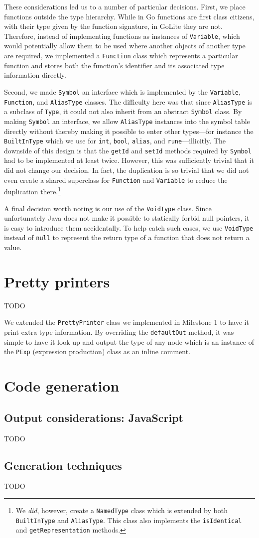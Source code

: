 \documentclass[oneside]{article}
\begin{document}
These considerations led us to a number of particular decisions. First, we place functions outside the type hierarchy. While in Go functions are first class citizens, with their type given by the function signature, in GoLite they are not. Therefore, instead of implementing functions as instances of \texttt{Variable}, which would potentially allow them to be used where another objects of another type are required, we implemented a \texttt{Function} class which represents a particular function and stores both the function's identifier and its associated type information directly.

Second, we made \texttt{Symbol} an interface which is implemented by the \texttt{Variable}, \texttt{Function}, and \texttt{AliasType} classes. The difficulty here was that since \texttt{AliasType} is a subclass of \texttt{Type}, it could not also inherit from an abstract \texttt{Symbol} class. By making \texttt{Symbol} an interface, we allow \texttt{AliasType} instances into the symbol table directly without thereby making it possible to enter other types---for instance the \texttt{BuiltInType} which we use for \texttt{int}, \texttt{bool}, \texttt{alias}, and \texttt{rune}---illicitly. The downside of this design is that the \texttt{getId} and \texttt{setId} methods required by \texttt{Symbol} had to be implemented at least twice. However, this was sufficiently trivial that it did not change our decision. In fact, the duplication is so trivial that we did not even create a shared superclass for \texttt{Function} and \texttt{Variable} to reduce the duplication there.\footnote{We \emph{did}, however, create a \texttt{NamedType} class which is extended by both \texttt{BuiltInType} and \texttt{AliasType}. This class also implements the \texttt{isIdentical} and \texttt{getRepresentation} methods.}

A final decision worth noting is our use of the \texttt{VoidType} class. Since unfortunately Java does not make it possible to statically forbid null pointers, it is easy to introduce them accidentally. To help catch such cases, we use \texttt{VoidType} instead of \texttt{null} to represent the return type of a function that does not return a value.

\section{Pretty printers}

TODO

We extended the \verb|PrettyPrinter| class we implemented in Milestone 1 to have it print extra type information. By overriding the \verb|defaultOut| method, it was simple to have it look up and output the type of any node which is an instance of the \verb|PExp| (expression production) class as an inline comment.

\section{Code generation}
\subsection{Output considerations: JavaScript}

TODO

\subsection{Generation techniques}

TODO
\end{document}
